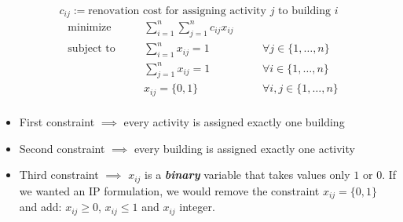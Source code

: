 \begin{exbox}
\begin{example}
        \[
            c_{ij}:=\text{renovation cost for assigning activity $j$ to building $i$}
        \]
        \begin{equation}
            \begin{aligned}
                 & \text{minimize}   & \quad & \sum\limits_{i = 1}^{n}\sum\limits_{j = 1}^{n}c_{ij}x_{ij}                                       \\
                 & \text{subject to} &       & \sum\limits_{i = 1}^{n}x_{ij}=1                            & \quad & \forall j\in\{1,\dots,n\}   \\
                 &                   &       & \sum\limits_{j = 1}^{n}x_{ij}=1                            & \quad & \forall i\in\{1,\dots,n\}   \\
                 &                   &       & x_{ij}=\{0,1\}                                             & \quad & \forall i,j\in\{1,\dots,n\} \\
                 &                   &       &
            \end{aligned}\tag{IP}
        \end{equation}
        \begin{itemize}
            \item First constraint $\implies$ every activity is assigned exactly one building
            \item Second constraint $\implies$ every building is assigned exactly one activity
            \item Third constraint $\implies $ $ x_{ij} $ is a \textbf{\emph{binary}} variable that takes
                  values only $ 1 $ or $ 0 $. If we wanted an IP formulation,
                  we would remove the constraint $ x_{ij}=\{0,1\} $
                  and add: $ x_{ij}\geqslant  0 $, $ x_{ij}\leqslant 1 $ and $ x_{ij} $ integer.
        \end{itemize}

    \end{example}
\end{exbox}

